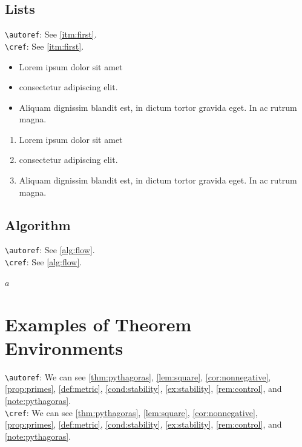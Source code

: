 \documentclass[twocolumn]{article}
\theoremstyle{definition}
\theoremstyle{remark}
\begin{document}
\lipsum[8-9]

\subsection{Lists}

\verb+\autoref+: See \autoref{itm:first}. \\
\verb+\cref+: See \cref{itm:first}.

\begin{itemize}
    \item Lorem ipsum dolor sit amet
    \item consectetur adipiscing elit.
    \item Aliquam dignissim blandit est, in dictum tortor gravida eget. In ac rutrum magna.
\end{itemize}

\begin{enumerate}[label=\Roman*.]
    \item \label{itm:first} Lorem ipsum dolor sit amet
    \item consectetur adipiscing elit.
    \item Aliquam dignissim blandit est, in dictum tortor gravida eget. In ac rutrum magna.
\end{enumerate}

\subsection{Algorithm}

\verb+\autoref+: See \autoref{alg:flow}. \\
\verb+\cref+: See \cref{alg:flow}.

\begin{algorithm}[h]
\caption{Euclid’s Algorithm for GCD}   %

\Return $a$\;                          %
\label{alg:flow}
\end{algorithm}

\section{Examples of Theorem Environments}

\verb+\autoref+: We can see \autoref{thm:pythagoras}, \autoref{lem:square}, \autoref{cor:nonnegative}, 
\autoref{prop:primes}, \autoref{def:metric}, \autoref{cond:stability}, 
\autoref{ex:stability}, \autoref{rem:control}, and \autoref{note:pythagoras}. \\
\verb+\cref+: We can see \cref{thm:pythagoras}, \cref{lem:square}, \cref{cor:nonnegative}, 
\cref{prop:primes}, \cref{def:metric}, \cref{cond:stability}, 
\cref{ex:stability}, \cref{rem:control}, and \cref{note:pythagoras}.
\end{document}
